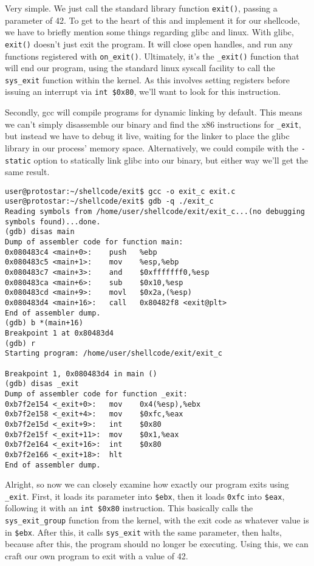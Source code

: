 Very simple. We just call the standard library function \texttt{exit()}, passing a parameter of 42.
To get to the heart of this and implement it for our shellcode, we have to briefly mention
some things regarding glibc and linux. With glibc, \texttt{exit()} doesn't just exit the program.
It will close open handles, and run any functions registered with \texttt{on\_exit()}. Ultimately,
it's the \texttt{\_exit()} function that will end our program, using the standard linux syscall
facility to call the \texttt{sys\_exit} function within the kernel. As this involves setting
registers before issuing an interrupt via \texttt{int \$0x80}, we'll want to look for this instruction.

Secondly, gcc will compile programs for dynamic linking by default. This means we can't
simply disassemble our binary and find the x86 instructions for \texttt{\_exit}, but
instead we have to debug it live, waiting for the linker to place the glibc library in
our process' memory space. Alternatively, we could compile with the \texttt{-static}
option to statically link glibc into our binary, but either way we'll get the same result.

\begin{lstlisting}
user@protostar:~/shellcode/exit$ gcc -o exit_c exit.c
user@protostar:~/shellcode/exit$ gdb -q ./exit_c
Reading symbols from /home/user/shellcode/exit/exit_c...(no debugging symbols found)...done.
(gdb) disas main
Dump of assembler code for function main:
0x080483c4 <main+0>:    push   %ebp
0x080483c5 <main+1>:    mov    %esp,%ebp
0x080483c7 <main+3>:    and    $0xfffffff0,%esp
0x080483ca <main+6>:    sub    $0x10,%esp
0x080483cd <main+9>:    movl   $0x2a,(%esp)
0x080483d4 <main+16>:   call   0x80482f8 <exit@plt>
End of assembler dump.
(gdb) b *(main+16)
Breakpoint 1 at 0x80483d4
(gdb) r
Starting program: /home/user/shellcode/exit/exit_c 

Breakpoint 1, 0x080483d4 in main ()
(gdb) disas _exit
Dump of assembler code for function _exit:
0xb7f2e154 <_exit+0>:   mov    0x4(%esp),%ebx
0xb7f2e158 <_exit+4>:   mov    $0xfc,%eax
0xb7f2e15d <_exit+9>:   int    $0x80
0xb7f2e15f <_exit+11>:  mov    $0x1,%eax
0xb7f2e164 <_exit+16>:  int    $0x80
0xb7f2e166 <_exit+18>:  hlt    
End of assembler dump.
\end{lstlisting}

Alright, so now we can closely examine how exactly our program exits using \texttt{\_exit}. First, it loads its
parameter into \texttt{\$ebx}, then it loads \texttt{0xfc} into \texttt{\$eax}, following it with an \texttt{int \$0x80}
instruction. This basically calls the \texttt{sys\_exit\_group} function from the kernel, with the exit
code as whatever value is in \texttt{\$ebx}. After this, it calls \texttt{sys\_exit} with the same parameter,
then halts, because after this, the program should no longer be executing. Using this, we can craft our
own program to exit with a value of 42.


